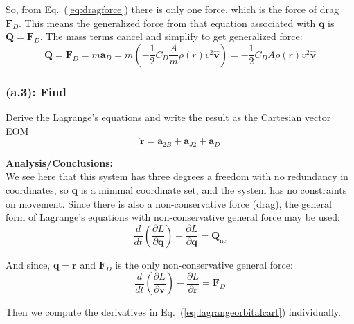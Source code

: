 \documentclass[titlepage]{article}
\begin{document}
\begin{mdframed}[linewidth=1pt, innertopmargin=10pt, innerbottommargin=10pt]
	So, from Eq.~(\ref{eq:dragforce}) there is only one force, which is the force of drag $\boldsymbol{F}_D$. This means the generalized force from that equation associated with $\boldsymbol{q}$ is $\boldsymbol{Q}=\boldsymbol{F}_D$. The mass terms cancel and simplify to get generalized force:
	\begin{equation}
		\boldsymbol{Q}=\boldsymbol{F}_D=m\boldsymbol{a}_D=m\left(-\frac{1}{2}C_D\frac{A}{m}\rho(r)v^2\hat{\boldsymbol{v}}\right)=-\frac{1}{2}C_DA\rho(r)v^2\hat{\boldsymbol{v}}
	\end{equation}
\end{mdframed}

\subsubsection*{(a.3): Find}

Derive the Lagrange's equations and write the result as the Cartesian vector EOM
\begin{equation}
	\ddot{\boldsymbol{r}}=\boldsymbol{a}_{2B}+\boldsymbol{a}_{J2}+\boldsymbol{a}_D
	\label{eq:lagrange}
\end{equation}

\textbf{Analysis/Conclusions:}\\

We see here that this system has three degrees a freedom with no redundancy in coordinates, so $\boldsymbol{q}$ is a minimal coordinate set, and the system has no constraints on movement. Since there is also a non-conservative force (drag), the general form of Lagrange's equations with non-conservative general force may be used:
\begin{equation}
	\frac{d}{dt}\left(\frac{\partial L}{\partial\dot{\boldsymbol{q}}}\right)-\frac{\partial L}{\partial\boldsymbol{q}}=\boldsymbol{Q}_{\text{nc}}
\end{equation}

And since, $\boldsymbol{q}=\boldsymbol{r}$ and $\boldsymbol{F}_D$ is the only non-conservative general force:
\begin{equation}
	\frac{d}{dt}\left(\frac{\partial L}{\partial\boldsymbol{v}}\right)-\frac{\partial L}{\partial\boldsymbol{r}}=\boldsymbol{F}_{D}
	\label{eq:lagrangeorbitalcart}
\end{equation}

Then we compute the derivatives in Eq.~(\ref{eq:lagrangeorbitalcart}) individually.\\
\end{document}
